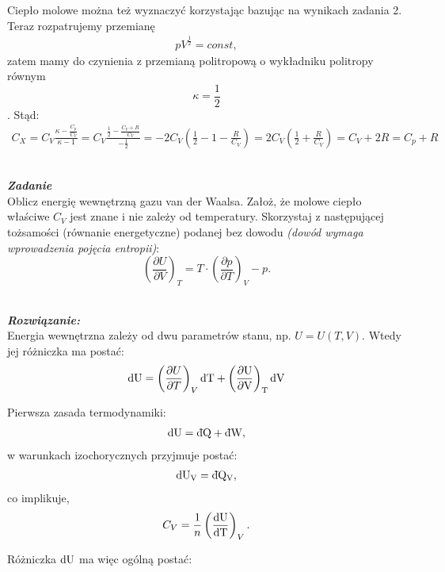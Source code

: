 \documentclass[11pt,a4paper]{article}
\newcounter{zadanie}\newcommand{\zadanie}[1][]{\addtocounter{zadanie}{1} ~\\  {\bf \emph{Zadanie \arabic{zadanie} #1 }} \\}
\newcounter{rozwiazanie}\newcommand{\rozwiazanie}[1][]{\addtocounter{rozwiazanie}{1} ~\\  {\bf \emph{Rozwiązanie: }} \\}
\newcommand{\dbar}{{\mkern3mu\mathchar'26\mkern-12mu d}}
\begin{document}
Ciepło molowe można też wyznaczyć korzystając bazując na wynikach zadania 2. Teraz rozpatrujemy przemianę
\begin{align}
pV^{\frac{1}{2}}=const,
\end{align}
zatem mamy do czynienia z przemianą politropową o wykładniku politropy równym $$\kappa = \frac{1}{2}$$. Stąd:
\begin{align}
C_X = C_V\frac{\kappa - \frac{C_p}{C_V}}{\kappa-1}=C_V\frac{\frac{1}{2}-\frac{C_V+R}{C_V}}{-\frac{1}{2}}=-2C_V(\frac{1}{2}-1-\frac{R}{C_V})=2C_V(\frac{1}{2}+\frac{R}{C_V})=C_V+2R=C_p+R
\end{align}

\newpage
\zadanie
Oblicz energię wewnętrzną gazu van der Waalsa.
Założ, że molowe ciepło właściwe $C_V$ jest znane i nie zależy od temperatury.
Skorzystaj z następującej tożsamości (równanie energetyczne)
podanej bez dowodu {\em (dowód wymaga wprowadzenia pojęcia entropii)}:
\[ \left(\frac{\partial U}{\partial V}\right)_T = 
   T \cdot \left(\frac{\partial p}{\partial T}\right)_V - p.\]
\rozwiazanie 
Energia wewnętrzna zależy od dwu parametrów stanu, np. $U = U(T, V)$. Wtedy jej różniczka ma postać:
\begin{align}
  \rm{d} U &= \left(\frac{\partial U}{\partial T} \right)_V \rm{d}T  + \left(\frac{\partial U}{\partial V} \right)_T \rm{d}V \\
\end{align}

Pierwsza zasada termodynamiki:
\begin{align}
\rm{d}U = \rm{\dbar}Q + \rm{\dbar}W,
\end{align}
w warunkach izochorycznych przyjmuje postać:
\begin{align}
\rm{d}U_V = \rm{\dbar}Q _V, 
\end{align}
co implikuje,
\begin{align}
C_V = \frac{1}{n}\left( \frac{\rm{d}U}{\rm{d}T}\right)_V.
\end{align}

Różniczka $\rm{d}U$ ma więc ogólną postać:
\end{document}
